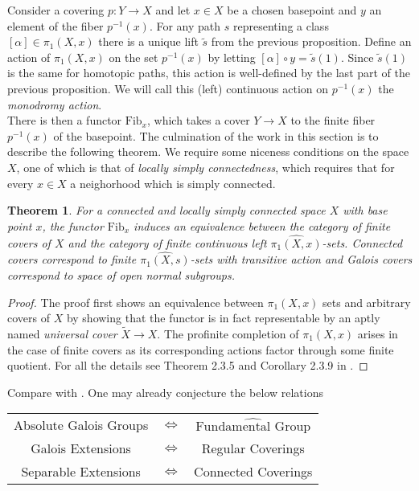 \documentclass{article}
\newtheorem{theorem}{Theorem}[section]
\theoremstyle{definition}
\theoremstyle{remark}
\theoremstyle{plain}
\begin{document}
Consider a covering $p: Y \to X$ and let $x \in X$ be a chosen basepoint and $y$ an element of the fiber $p^{-1}(x)$.
	For any path $s$ representing a class $[\alpha] \in \pi_1(X,x)$ there is a unique lift $\widetilde{s}$ from the previous proposition.
	Define an action of $\pi_1(X,x)$ on the set $p^{-1}(x)$ by letting $[\alpha] \circ y = \widetilde{s}(1)$.
	Since $\widetilde{s}(1)$ is the same for homotopic paths, this action is well-defined by the last part of the previous proposition.
	We will call this (left) continuous action on $p^{-1}(x)$ the \textit{monodromy action}.\\
	\indent There is then a functor $\text{Fib}_x$, which takes a cover $Y \to X$ to the finite fiber $p^{-1}(x)$ of the basepoint.
The culmination of the work in this section is to describe the following theorem.
We require some niceness conditions on the space $X$, one of which is that of \textit{locally simply connectedness}, which requires that for every $x \in X$ a neighorhood which is simply connected.

	\begin{theorem}
	For a connected and locally simply connected space $X$ with base point $x$, the functor $\text{Fib}_x$ induces an equivalence between the category of finite covers of $X$ and the category of finite continuous left $\widehat{\pi_1(X,x)}$-sets.
	Connected covers correspond to finite $\widehat{\pi_1(X,s)}$-sets with transitive action and Galois covers correspond to space of open normal subgroups.
\end{theorem}
\begin{proof}
	The proof first shows an equivalence between $\pi_1(X,x)$ sets and arbitrary covers of $X$ by showing that the functor is in fact representable by an aptly named \textit{universal cover} $\widetilde{X} \to X$.
The profinite completion of $\pi_1(X,x)$ arises in the case of finite covers as its corresponding actions factor through some finite quotient.
	For all the details see Theorem 2.3.5 and Corollary 2.3.9 in \cite{Szamuely}.
\end{proof}


Compare with .
One may already conjecture the below relations
\begin{center}
\begin{tabular}{ |c c c| } 
\hline
	Absolute Galois Groups & $\Longleftrightarrow$ & $\widehat{\text{Fundamental Group}}$ \\
 
	Galois Extensions & $\Longleftrightarrow$ & Regular Coverings\\
 
	Separable Extensions & $\Longleftrightarrow$ & Connected Coverings\\
 \hline
\end{tabular}
\end{center}
\end{document}
